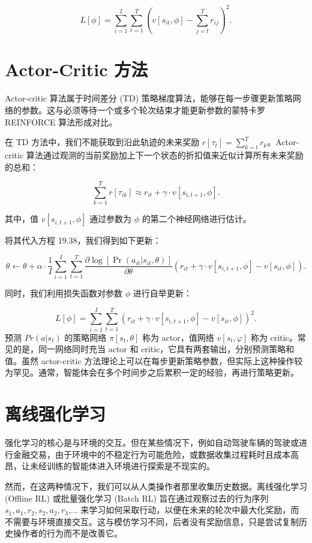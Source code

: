 \[
L[\phi] = \sum_{i=1}^{I} \sum_{t=1}^{T} \left( v[s_{it}, \phi] - \sum_{j=t}^{T} r_{ij} \right)^2. \tag{19.39}
\]

\section{Actor-Critic 方法}
Actor-critic 算法属于时间差分 (TD) 策略梯度算法，能够在每一步骤更新策略网络的参数。这与必须等待一个或多个轮次结束才能更新参数的蒙特卡罗 REINFORCE 算法形成对比。

在 TD 方法中，我们不能获取到沿此轨迹的未来奖励 \(r[\tau_t] = \sum_{k=t}^T r_k\)。Actor-critic 算法通过观测的当前奖励加上下一个状态的折扣值来近似计算所有未来奖励的总和：

\[
\sum_{k=1}^{T} r[\tau_{ik}] \approx r_{it} + \gamma \cdot v[s_{i,t+1}, \phi]. \tag{19.40}
\]

其中，值 \(v[s_{i,t+1}, \phi]\) 通过参数为 \(\phi\) 的第二个神经网络进行估计。

将其代入方程 19.38，我们得到如下更新：

\[
\theta \leftarrow \theta + \alpha \cdot \frac{1}{I} \sum_{i=1}^{I} \sum_{t=1}^{T} \frac{\partial \log[\Pr(a_{it}|s_{it}, \theta)]}{\partial \theta} (r_{it} + \gamma \cdot v[s_{i,t+1}, \phi] - v[s_{it}, \phi]). \tag{19.41}
\]

同时，我们利用损失函数对参数 \(\phi\) 进行自举更新：

\[
L[\phi] = \sum_{i=1}^{I} \sum_{t=1}^{T} \left( r_{it} + \gamma \cdot v[s_{i,t+1}, \phi] - v[s_{it}, \phi] \right)^2. \tag{19.42}
\]
预测 \(Pr(a|s_t)\) 的策略网络 \(π[s_t,θ]\) 称为 actor，值网络 \(v[s_t,φ]\) 称为 critic。常见的是，同一网络同时充当 actor 和 critic，它具有两套输出，分别预测策略和值。虽然 actor-critic 方法理论上可以在每步更新策略参数，但实际上这种操作较为罕见。通常，智能体会在多个时间步之后累积一定的经验，再进行策略更新。

\section{离线强化学习}
强化学习的核心是与环境的交互。但在某些情况下，例如自动驾驶车辆的驾驶或进行金融交易，由于环境中的不稳定行为可能危险，或数据收集过程耗时且成本高昂，让未经训练的智能体进入环境进行探索是不现实的。

然而，在这两种情况下，我们可以从人类操作者那里收集历史数据。离线强化学习 (Offline RL) 或批量强化学习 (Batch RL) 旨在通过观察过去的行为序列 \(s_1,a_1,r_2,s_2,a_2,r_3\),... 来学习如何采取行动，以便在未来的轮次中最大化奖励，而不需要与环境直接交互。这与模仿学习不同，后者没有奖励信息，只是尝试复制历史操作者的行为而不是改善它。

